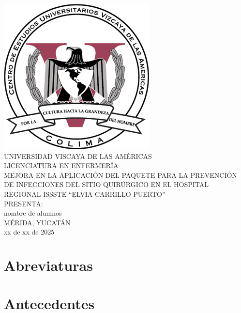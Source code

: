 \documentclass[12 pt]{report}
\begin{document}
	\begin{titlepage}
		\begin{center}
			\includegraphics [scale=0.5]{UVA-logo.png} \\
			\vspace{15 pt}
			\LARGE{UNIVERSIDAD VISCAYA DE LAS AMÉRICAS} \\
			\vspace{20 pt}
			\LARGE{LICENCIATURA EN ENFERMERÍA}\\
			\vspace{30 pt}
			\large{MEJORA EN LA APLICACIÓN DEL PAQUETE PARA LA PREVENCIÓN DE INFECCIONES DEL SITIO QUIRÚRGICO EN EL HOSPITAL REGIONAL ISSSTE ``ELVIA CARRILLO PUERTO'' }\\
			\vspace{40 pt}
			\large{PRESENTA:}\\
			\vspace{30 pt}
			\large{nombre de alumnos}\\
			\vspace{40 pt}
			\large{MÉRIDA, YUCATÁN}\\
			\large{xx de xx de 2025}		
		\end{center}
	\end{titlepage}	
	
	\tableofcontents
	\thispagestyle{empty}
	
	\begin{abstract}
		
	\end{abstract}
	
	
	\section*{Abreviaturas} 
	\section*{Antecedentes} 
	
\end{document}
